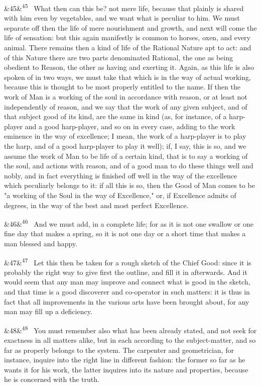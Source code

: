 \documentclass[12pt]{article}
\newcommand{\para}[1][]{\par\noindent\ifx&#1&\else\textsuperscript{\footnotesize #1}~\fi}
\begin{document}
\para[45] What then can this be? not mere life, because that plainly is shared with him even by vegetables, and we want what is peculiar to him. We must separate off then the life of mere nourishment and growth, and next will come the life of sensation: but this again manifestly is common to horses, oxen, and every animal. There remains then a kind of life of the Rational Nature apt to act: and of this Nature there are two parts denominated Rational, the one as being obedient to Reason, the other as having and exerting it. Again, as this life is also spoken of in two ways, we must take that which is in the way of actual working, because this is thought to be most properly entitled to the name. If then the work of Man is a working of the soul in accordance with reason, or at least not independently of reason, and we say that the work of any given subject, and of that subject good of its kind, are the same in kind (as, for instance, of a harp-player and a good harp-player, and so on in every case, adding to the work eminence in the way of excellence; I mean, the work of a harp-player is to play the harp, and of a good harp-player to play it well); if, I say, this is so, and we assume the work of Man to be life of a certain kind, that is to say a working of the soul, and actions with reason, and of a good man to do these things well and nobly, and in fact everything is finished off well in the way of the excellence which peculiarly belongs to it: if all this is so, then the Good of Man comes to be "a working of the Soul in the way of Excellence," or, if Excellence admits of degrees, in the way of the best and most perfect Excellence.

\para[46] And we must add, in a complete life; for as it is not one swallow or one fine day that makes a spring, so it is not one day or a short time that makes a man blessed and happy.

\para[47] Let this then be taken for a rough sketch of the Chief Good: since it is probably the right way to give first the outline, and fill it in afterwards. And it would seem that any man may improve and connect what is good in the sketch, and that time is a good discoverer and co-operator in such matters: it is thus in fact that all improvements in the various arts have been brought about, for any man may fill up a deficiency.

\para[48] You must remember also what has been already stated, and not seek for exactness in all matters alike, but in each according to the subject-matter, and so far as properly belongs to the system. The carpenter and geometrician, for instance, inquire into the right line in different fashion: the former so far as he wants it for his work, the latter inquires into its nature and properties, because he is concerned with the truth.
\end{document}
